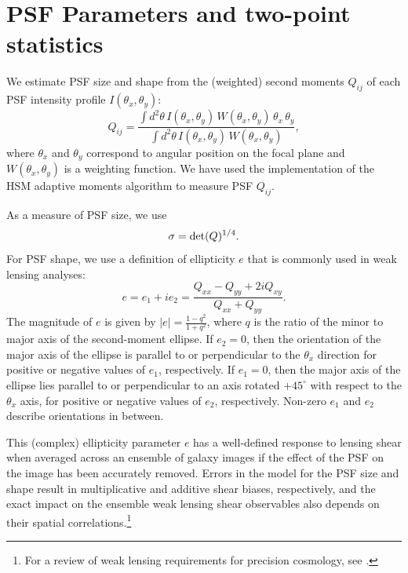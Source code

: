 \documentclass[twocolumn]{aastex631}
\begin{document}
\section{PSF Parameters and two-point statistics}\label{sec:definitions2pcf}

We estimate PSF size and shape from the (weighted) second moments $Q_{ij}$ of each PSF intensity profile $I(\theta_x, \theta_y)$:
\begin{equation}
    Q_{ij} = \frac{\int d^2\theta \, I(\theta_x,\theta_y) \, W(\theta_x,\theta_y) \, \theta_x \, \theta_y }{ \int d^2\theta \, I(\theta_x,\theta_y) \, W(\theta_x,\theta_y)},
\end{equation}
where $\theta_x$ and  $\theta_y$ correspond to angular position on the focal plane and $W(\theta_x,\theta_y)$ is a weighting function. 
We have used the \galsim implementation of the HSM adaptive moments algorithm \citep{hirata_shear_2003} to measure PSF $Q_{ij}$.

As a measure of PSF size, we use 
\begin{equation}
    \sigma = {\rm det}(Q)^{1/4}. 
\end{equation}
For PSF shape, we use a definition of ellipticity $e$ that is commonly used in weak lensing analyses: 
\begin{equation}
    e = e_1 + i e_2 = \frac{Q_{xx} - Q_{yy} + 2iQ_{xy}}{Q_{xx} + Q_{yy}}. 
    \label{eqn:e_def12}
\end{equation}
The magnitude of $e$ is given by  $|e| = \frac{1-q^2}{1+q^2}$, where $q$ is the ratio of the minor to major axis of the second-moment ellipse. 
If $e_2=0$, then the orientation of the major axis of the ellipse is parallel to or perpendicular to the $\theta_x$ direction for positive or negative values of $e_1$, respectively. 
If $e_1=0$, then the major axis of the ellipse lies parallel to or perpendicular to an axis rotated $+45^\circ$ with respect to the $\theta_x$ axis, for positive or negative values of $e_2$, respectively.
Non-zero $e_1$ and $e_2$ describe orientations in between. 

This (complex) ellipticity parameter $e$ has a well-defined response to lensing shear when averaged across an ensemble of galaxy images if the effect of the PSF on the image has been accurately removed. 
Errors in the model for the PSF size and shape result in multiplicative and additive shear biases, respectively, and the exact impact on the ensemble weak lensing shear observables also depends on their spatial correlations.\footnote{For a review of weak lensing requirements for precision cosmology, see \cite{mandelbaum_weak_2018}.} 
\end{document}
